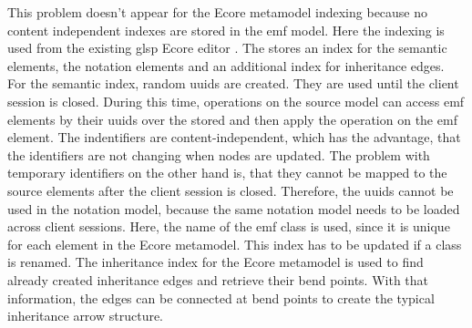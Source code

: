   This problem doesn't appear for the Ecore metamodel indexing because no content independent indexes are stored in the \ac{emf} model. Here the indexing is used from the existing \ac{glsp} Ecore editor \cite{glsp-ecore-repo}. The  stores an index for the semantic elements, the notation elements and an additional index for inheritance edges.
  For the semantic index, random \acp{uuid} are created. They are used until the client session is closed. During this time, operations on the source model can access \ac{emf} elements by their \acp{uuid} over the stored  and then apply the operation on the \ac{emf} element. The indentifiers are content-independent, which has the advantage, that the identifiers are not changing when nodes are updated. The problem with temporary identifiers on the other hand is, that they cannot be mapped to the source elements after the client session is closed. Therefore, the \acp{uuid} cannot be used in the notation model, because the same notation model needs to be loaded across client sessions. Here, the name of the \ac{emf} class is used, since it is unique for each element in the Ecore metamodel. This index has to be updated if a class is renamed.
  The inheritance index for the Ecore metamodel is used to find already created inheritance edges and retrieve their bend points. With that information, the edges can be connected at bend points to create the typical inheritance arrow structure.

